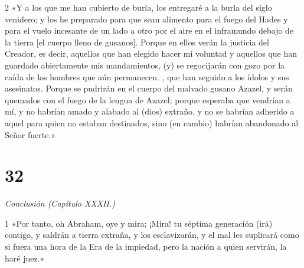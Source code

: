 \par 2 «Y a los que me han cubierto de burla, los entregaré a la burla del siglo venidero; y los he preparado para que sean alimento para el fuego del Hades y para el vuelo incesante de un lado a otro por el aire en el inframundo debajo de la tierra [el cuerpo lleno de gusanos]. Porque en ellos verán la justicia del Creador, es decir, aquellos que han elegido hacer mi voluntad y aquellos que han guardado abiertamente mis mandamientos, (y) se regocijarán con gozo por la caída de los hombres que aún permanecen. , que han seguido a los ídolos y sus asesinatos. Porque se pudrirán en el cuerpo del malvado gusano Azazel, y serán quemados con el fuego de la lengua de Azazel; porque esperaba que vendrían a mí, y no habrían amado y alabado al (dios) extraño, y no se habrían adherido a aquel para quien no estaban destinados, sino (en cambio) habrían abandonado al Señor fuerte.»

\chapter{32}

\par \textit{Conclusión (Capítulo XXXII.)}

\par 1 «Por tanto, oh Abraham, oye y mira; ¡Mira! tu séptima generación (irá) contigo, y saldrán a tierra extraña, y los esclavizarán, y el mal les suplicará como si fuera una hora de la Era de la impiedad, pero la nación a quien servirán, la haré juez.»

